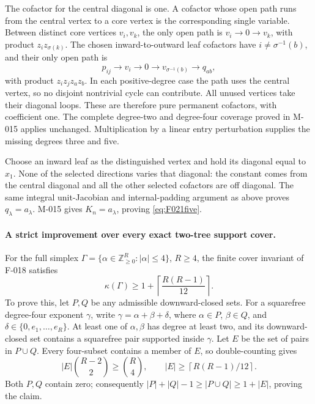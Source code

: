The cofactor for the central diagonal is one. A cofactor
whose open path runs from the central vertex to a core
vertex is the corresponding single variable. Between distinct
core vertices \(v_i,v_k\), the only open path is
\(v_i\longrightarrow0\longrightarrow v_k\), with product
\(z_i z_{\sigma(k)}\). The chosen inward-to-outward leaf
cofactors have \(i\ne\sigma^{-1}(b)\), and their only
open path is
\[
 p_{ij}\longrightarrow v_i\longrightarrow0
         \longrightarrow v_{\sigma^{-1}(b)}\longrightarrow q_{ab},
\]
with product \(z_i z_j z_a z_b\). In each positive-degree
case the path uses the central vertex, so no disjoint
nontrivial cycle can contribute. All unused vertices take
their diagonal loops. These are therefore pure permanent
cofactors, with coefficient one. The complete degree-two
and degree-four coverage proved in M-015 applies unchanged.
Multiplication by a linear entry perturbation supplies the
missing degrees three and five.

Choose an inward leaf as the distinguished vertex and hold
its diagonal equal to \(x_1\). None of the selected directions
varies that diagonal: the constant comes from the central
diagonal and all the other selected cofactors are off diagonal.
The same integral unit-Jacobian and internal-padding argument
as above proves \(q_\lambda=a_\lambda\). M-015 gives
\(K_n=a_\lambda\), proving \eqref{eq:F021five}.

\paragraph{A strict improvement over every exact two-tree support cover.}
For the full simplex
\(\Gamma=\{\alpha\in\mathbb Z_{\geq0}^R:|\alpha|\leq4\}\),
\(R\geq4\), the finite cover invariant of F-018 satisfies
\begin{equation}\label{eq:F021cover}
             \kappa(\Gamma)\geq
                          1+\left\lceil\frac{R(R-1)}{12}\right\rceil.
\end{equation}
To prove this, let \(P,Q\) be any admissible downward-closed
sets. For a squarefree degree-four exponent \(\gamma\),
write \(\gamma=\alpha+\beta+\delta\), where
\(\alpha\in P\), \(\beta\in Q\), and
\(\delta\in\{0,e_1,\ldots,e_R\}\). At least one of
\(\alpha,\beta\) has degree at least two, and its
downward-closed set contains a squarefree pair supported
inside \(\gamma\). Let \(E\) be the set of pairs in
\(P\cup Q\). Every four-subset contains a member of \(E\),
so double-counting gives
\[
 |E|\binom{R-2}{2}\geq\binom R4,
          \qquad |E|\geq\left\lceil R(R-1)/12\right\rceil.
\]
Both \(P,Q\) contain zero; consequently
\(|P|+|Q|-1\geq|P\cup Q|\geq1+|E|\), proving the claim.

